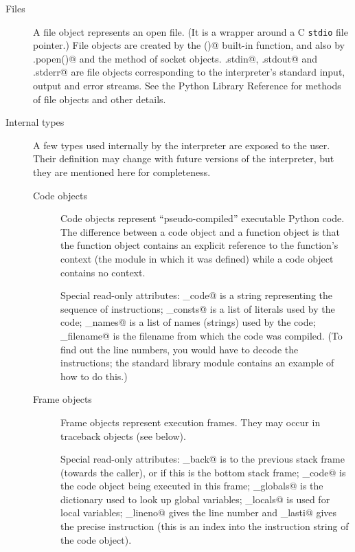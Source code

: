 \begin{description}
\item[Files]
A file object represents an open file.  (It is a wrapper around a C
{\tt stdio} file pointer.)  File objects are created by the
\verb@open()@ built-in function, and also by \verb@posix.popen()@ and
the \verb@makefile@ method of socket objects.  \verb@sys.stdin@,
\verb@sys.stdout@ and \verb@sys.stderr@ are file objects corresponding
to the interpreter's standard input, output and error streams.
See the Python Library Reference for methods of file objects and other
details.

\item[Internal types]
A few types used internally by the interpreter are exposed to the user.
Their definition may change with future versions of the interpreter,
but they are mentioned here for completeness.

\begin{description}

\item[Code objects]
Code objects represent ``pseudo-compiled'' executable Python code.
The difference between a code
object and a function object is that the function object contains an
explicit reference to the function's context (the module in which it
was defined) while a code object contains no context.

Special read-only attributes: \verb@co_code@ is a string representing
the sequence of instructions; \verb@co_consts@ is a list of literals
used by the code; \verb@co_names@ is a list of names (strings) used by
the code; \verb@co_filename@ is the filename from which the code was
compiled.  (To find out the line numbers, you would have to decode the
instructions; the standard library module \verb@dis@ contains an
example of how to do this.)

\item[Frame objects]
Frame objects represent execution frames.  They may occur in traceback
objects (see below).

Special read-only attributes: \verb@f_back@ is to the previous
stack frame (towards the caller), or \verb@None@ if this is the bottom
stack frame; \verb@f_code@ is the code object being executed in this
frame; \verb@f_globals@ is the dictionary used to look up global
variables; \verb@f_locals@ is used for local variables;
\verb@f_lineno@ gives the line number and \verb@f_lasti@ gives the
precise instruction (this is an index into the instruction string of
the code object).


\end{description}
\end{description}
